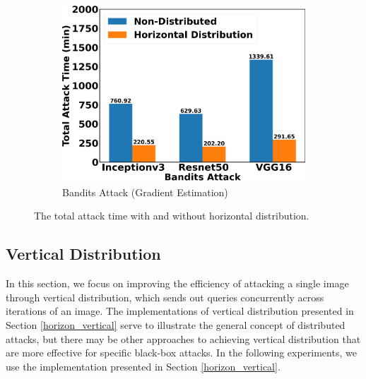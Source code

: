 \begin{figure}[tbp]
\begin{subfigure}[b]{0.6\textwidth}
    \centering
    \includegraphics[width=\textwidth]{figures/chapter_classification/bandits_attack_horizontal_time.png}
    \caption{Bandits Attack (Gradient Estimation)}
    \label{fig:bandits_horizon}
\end{subfigure}
\caption{The total attack time with and without horizontal distribution.}
\label{fig.horizon_time}
\end{figure}

\clearpage

\subsection{Vertical Distribution}

In this section, we focus on improving the efficiency of attacking a single image through vertical distribution, which sends out queries concurrently across iterations of an image. The implementations of vertical distribution presented in Section \ref{horizon_vertical} serve to illustrate the general concept of distributed attacks, but there may be other approaches to achieving vertical distribution that are more effective for specific black-box attacks. In the following experiments, we use the implementation presented in Section \ref{horizon_vertical}.


